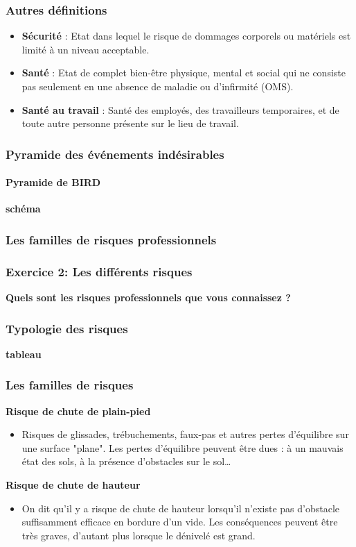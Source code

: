 \documentclass{beamer}
\begin{document}
\begin{frame}
\frametitle{Autres définitions}
\begin{itemize}
\item \textbf{Sécurité} : Etat dans lequel le risque de dommages corporels ou matériels est limité à un niveau acceptable.
\item \textbf{Santé} : Etat de complet bien-être physique, mental et social qui ne consiste pas seulement en une absence de maladie ou d’infirmité (OMS).
\item \textbf{Santé au travail} : Santé des employés, des travailleurs temporaires, et de toute autre personne présente sur le lieu de travail.
\end{itemize}
\end{frame}


\begin{frame}
\frametitle{Pyramide des événements indésirables}
\framesubtitle{Pyramide de BIRD}
\textbf{schéma}
\end{frame}

\begin{frame}
\frametitle{Les familles de risques professionnels}
\end{frame}

\begin{frame}
\frametitle{Exercice 2: Les différents risques}
\textbf{Quels sont les risques professionnels que vous connaissez ?}
\end{frame}

\begin{frame}
\frametitle{Typologie des risques}
\textbf{tableau}
\end{frame}

\begin{frame}
\frametitle{Les familles de risques}
\textbf{Risque de chute de plain-pied}
\begin{itemize}
\item Risques de glissades, trébuchements, faux-pas et autres pertes d'équilibre sur une surface "plane". Les pertes d’équilibre peuvent être dues : à un mauvais état des sols, à la présence d’obstacles sur le sol…
\end{itemize}
\textbf{Risque de chute de hauteur}
\begin{itemize}
\item On dit qu'il y a risque de chute de hauteur lorsqu'il n'existe pas d'obstacle suffisamment efficace en bordure d'un vide. Les conséquences peuvent être très graves, d’autant plus lorsque le dénivelé est grand.
\end{itemize}
\end{frame}
\end{document}
